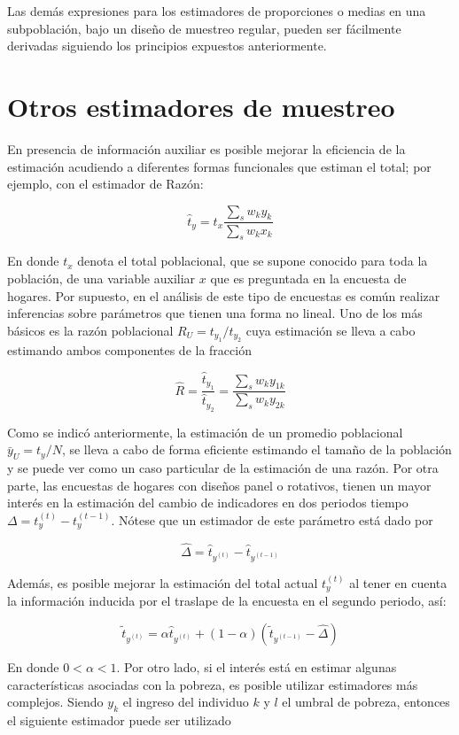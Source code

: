 \documentclass[
  10pt,
  spanish,
]{book}
\begin{document}
Las demás expresiones para los estimadores de proporciones o medias en una subpoblación, bajo un diseño de muestreo regular, pueden ser fácilmente derivadas siguiendo los principios expuestos anteriormente.

\hypertarget{otros-estimadores-de-muestreo}{%
\section{Otros estimadores de muestreo}\label{otros-estimadores-de-muestreo}}

En presencia de información auxiliar es posible mejorar la eficiencia de la estimación acudiendo a diferentes formas funcionales que estiman el total; por ejemplo, con el estimador de Razón:

\[
\hat{t}_y = t_x \frac{\sum_s w_k y_k}{\sum_s w_k x_k}
\]

En donde \(t_x\) denota el total poblacional, que se supone conocido para toda la población, de una variable auxiliar \(x\) que es preguntada en la encuesta de hogares. Por supuesto, en el análisis de este tipo de encuestas es común realizar inferencias sobre parámetros que tienen una forma no lineal. Uno de los más básicos es la razón poblacional \(R_U = t_{y_1} / t_{y_2}\) cuya estimación se lleva a cabo estimando ambos componentes de la fracción

\[
\hat{R}= \frac{\hat{t}_{y_1}}{\hat{t}_{y_2}}
= \frac{\sum_s w_k y_{1k}} {\sum_s w_k y_{2k}}
\]

Como se indicó anteriormente, la estimación de un promedio poblacional \(\bar{y}_U = t_y / N\), se lleva a cabo de forma eficiente estimando el tamaño de la población y se puede ver como un caso particular de la estimación de una razón. Por otra parte, las encuestas de hogares con diseños panel o rotativos, tienen un mayor interés en la estimación del cambio de indicadores en dos periodos tiempo \(\Delta = t_y^{(t)} - t_y^{(t-1)}\). Nótese que un estimador de este parámetro está dado por

\[
\hat{\Delta} = \hat{t}_{y^{(t)}} - \hat{t}_{y^{(t-1)}}
\]

Además, es posible mejorar la estimación del total actual \(t_y^{(t)}\) al tener en cuenta la información inducida por el traslape de la encuesta en el segundo periodo, así:

\[
\tilde{t}_{y^{(t)}} = \alpha \hat{t}_{y^{(t)}} 
+ (1 -\alpha) (\tilde{t}_{y^{(t-1)}} - \hat{\Delta})
\]

En donde \(0 < \alpha < 1\). Por otro lado, si el interés está en estimar algunas características asociadas con la pobreza, es posible utilizar estimadores más complejos. Siendo \(y_k\) el ingreso del individuo \(k\) y \(l\) el umbral de pobreza, entonces el siguiente estimador puede ser utilizado
\end{document}
